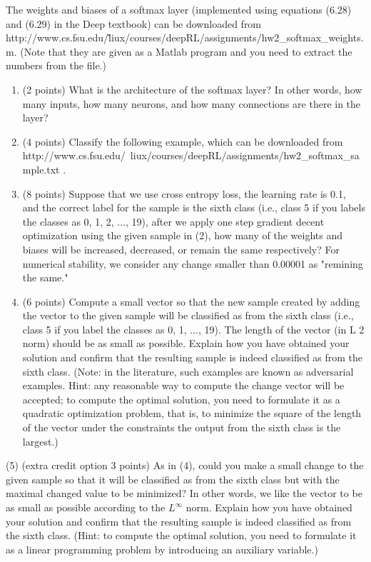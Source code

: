 \documentclass[
	12pt, %
]{../Template/fphw}
\begin{document}
\begin{problem}
The weights and biases of a softmax layer (implemented using equations (6.28) and (6.29)
in
the
Deep
textbook)
can
be
downloaded
from
http://www.cs.fsu.edu/\~liux/courses/deepRL/assignments/hw2\_softmax\_weights.m. (Note that they are given as a
Matlab program and you need to extract the numbers from the file.)
\begin{enumerate}[label=(\arabic*)]
\item (2 points) What is the architecture of the softmax layer? In other words, how many inputs, how many
neurons, and how many connections are there in the layer?
\item (4
points)
Classify
the
following
example,
which
can
be
downloaded
from
http://www.cs.fsu.edu/~liux/courses/deepRL/assignments/hw2\_softmax\_sample.txt .
\item (8 points) Suppose that we use cross entropy loss, the learning rate is 0.1, and the correct label for the
sample is the sixth class (i.e., class 5 if you labels the classes as 0, 1, 2, ..., 19), after we apply one step
gradient decent optimization using the given sample in (2), how many of the weights and biases will be
increased, decreased, or remain the same respectively? For numerical stability, we consider any change
smaller than 0.00001 as "remining the same."
\item (6 points) Compute a small vector so that the new sample created by adding the vector to the given sample
will be classified as from the sixth class (i.e., class 5 if you label the classes as 0, 1, ..., 19). The length of
the vector (in L 2 norm) should be as small as possible. Explain how you have obtained your solution and
confirm that the resulting sample is indeed classified as from the sixth class. (Note: in the literature, such
examples are known as adversarial examples. Hint: any reasonable way to compute the change vector will
be accepted; to compute the optimal solution, you need to formulate it as a quadratic optimization problem,
that is, to minimize the square of the length of the vector under the constraints the output from the sixth
class is the largest.)
\end{enumerate}

\end{problem}

\begin{problem}
    (5) (extra credit option 3 points) As in (4), could you make a small change to the given sample so that it will
be classified as from the sixth class but with the maximal changed value to be minimized? In other words,
we like the vector to be as small as possible according to the $L^{\infty}$ norm. Explain how you have obtained your
solution and confirm that the resulting sample is indeed classified as from the sixth class. (Hint: to compute
the optimal solution, you need to formulate it as a linear programming problem by introducing an auxiliary
variable.)
\end{problem}
\end{document}
